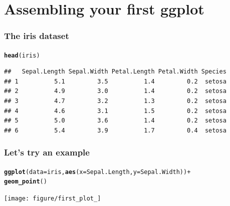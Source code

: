 \documentclass{beamer}\usepackage[]{graphicx}\usepackage[]{color}
\makeatletter
\newcommand{\hlkwd}[1]{\textcolor[rgb]{0.737,0.353,0.396}{\textbf{#1}}}%
\newenvironment{kframe}{%
 \def\at@end@of@kframe{}%
 \ifinner\ifhmode%
  \def\at@end@of@kframe{\end{minipage}}%
  \begin{minipage}{\columnwidth}%
 \fi\fi%
 \def\FrameCommand##1{\hskip\@totalleftmargin \hskip-\fboxsep
 \colorbox{shadecolor}{##1}\hskip-\fboxsep
     \hskip-\linewidth \hskip-\@totalleftmargin \hskip\columnwidth}%
 \MakeFramed {\advance\hsize-\width
   \@totalleftmargin\z@ \linewidth\hsize
   \@setminipage}}%
 {\par\unskip\endMakeFramed%
 \at@end@of@kframe}
\newenvironment{knitrout}{}{} %
\makeatother
\begin{document}

\section*{Assembling your first ggplot}
\frame{\sectionpage}


\begin{frame}[fragile]
\frametitle{The iris dataset}
\begin{knitrout}\footnotesize
{}\color{fgcolor}\begin{kframe}
\begin{alltt}
\hlkwd{head}(iris)
\end{alltt}
\begin{verbatim}
##   Sepal.Length Sepal.Width Petal.Length Petal.Width Species
## 1          5.1         3.5          1.4         0.2  setosa
## 2          4.9         3.0          1.4         0.2  setosa
## 3          4.7         3.2          1.3         0.2  setosa
## 4          4.6         3.1          1.5         0.2  setosa
## 5          5.0         3.6          1.4         0.2  setosa
## 6          5.4         3.9          1.7         0.4  setosa
\end{verbatim}
\end{kframe}
\end{knitrout}

\end{frame}


\begin{frame}[fragile]
\frametitle{Let's try an example}
\begin{knitrout}\footnotesize
{}\color{fgcolor}\begin{kframe}
\begin{alltt}
\hlkwd{ggplot}(data = iris, \hlkwd{aes}(x = Sepal.Length, y = Sepal.Width)) +
\hlkwd{geom_point}()
\end{alltt}
\end{kframe}

{\centering \texttt{[image: figure/first\_plot\_]} 

}



\end{knitrout}

\end{frame}
\end{document}
